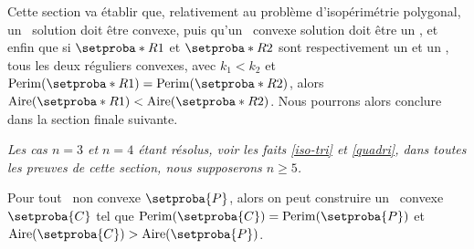 Cette section va établir que, relativement au problème d'isopérimétrie polygonal,
un \ngone\ solution doit être convexe, 
puis
qu'un \ngone\ convexe solution doit être un \nreg,
et enfin
que si $\setproba*{R}{1}$ et $\setproba*{R}{2}$ sont respectivement un  et un , tous les deux réguliers convexes, avec 
$k_1 < k_2$ et $\perim{\setproba*{R}{1}} = \perim{\setproba*{R}{2}}$, 
alors
$\area{\setproba*{R}{1}} < \area{\setproba*{R}{2}}$.
Nous pourrons alors conclure dans la section finale suivante.


\begin{tcolorbox}
	\itshape\small
	Les cas $n = 3$ et $n = 4$ étant résolus, voir les faits \ref{iso-tri} et \ref{quadri}, dans toutes les preuves de cette section, nous supposerons $n \geq 5$.
\end{tcolorbox}




\begin{fact} \label{must-be-conv}
    Pour tout \ngone\ non convexe $\setproba{P}$, alors on peut construire un \ngone\ convexe $\setproba{C}$ tel que
	$\perim{\setproba{C}} = \perim{\setproba{P}}$
	et
	$\area{\setproba{C}} > \area{\setproba{P}}$.
\end{fact}


